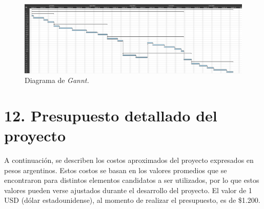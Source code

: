 \documentclass[
11pt, %
]{charter}
\begin{document}
\begin{landscape}
\begin{figure}[htpb]
\centering 
\vspace{80px}
\includegraphics[height=.5\textheight]{./Figuras/ganntImag.png}
\caption{Diagrama de \textit{Gannt.}}
\label{fig:ganntImag}
\end{figure}
\end{landscape}


\section{12. Presupuesto detallado del proyecto}
\label{sec:presupuesto}

A continuación, se describen los costos aproximados del proyecto expresados en pesos argentinos. Estos costos se basan en los valores promedios que se encontraron para distintos elementos candidatos a ser utilizados, por lo que estos valores pueden verse ajustados durante el desarrollo del proyecto. El valor de 1 USD (dólar estadounidense), al momento de realizar el presupuesto, es de \$1.200.
\end{document}
